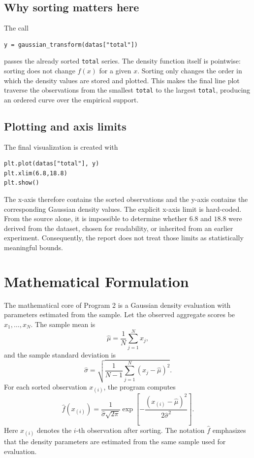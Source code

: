 \documentclass[11pt,a4paper]{article}
\begin{document}
\subsection{Why sorting matters here}
The call
\begin{lstlisting}
y = gaussian_transform(datas["total"])
\end{lstlisting}
passes the already sorted \texttt{total} series. The density function itself is pointwise: sorting does not change $f(x)$ for a given $x$. Sorting only changes the order in which the density values are stored and plotted. This makes the final line plot traverse the observations from the smallest \texttt{total} to the largest \texttt{total}, producing an ordered curve over the empirical support.

\subsection{Plotting and axis limits}
The final visualization is created with
\begin{lstlisting}
plt.plot(datas["total"], y)
plt.xlim(6.8,18.8)
plt.show()
\end{lstlisting}
The x-axis therefore contains the sorted observations and the y-axis contains the corresponding Gaussian density values. The explicit x-axis limit is hard-coded. From the source alone, it is impossible to determine whether $6.8$ and $18.8$ were derived from the dataset, chosen for readability, or inherited from an earlier experiment. Consequently, the report does not treat those limits as statistically meaningful bounds.

\section{Mathematical Formulation}
The mathematical core of Program 2 is a Gaussian density evaluation with parameters estimated from the sample. Let the observed aggregate scores be $x_1,\ldots,x_N$. The sample mean is
\begin{equation}
 \hat{\mu}=\frac{1}{N}\sum_{j=1}^{N}x_j,
\end{equation}
and the sample standard deviation is
\begin{equation}
 \hat{\sigma}=\sqrt{\frac{1}{N-1}\sum_{j=1}^{N}(x_j-\hat{\mu})^2}.
\end{equation}
For each sorted observation $x_{(i)}$, the program computes
\begin{equation}
 \hat{f}(x_{(i)})
 = \frac{1}{\hat{\sigma}\sqrt{2\pi}}
 \exp\!\left[
 -\frac{(x_{(i)}-\hat{\mu})^2}{2\hat{\sigma}^2}
 \right].
\end{equation}
Here $x_{(i)}$ denotes the $i$-th observation after sorting. The notation $\hat{f}$ emphasizes that the density parameters are estimated from the same sample used for evaluation.
\end{document}
